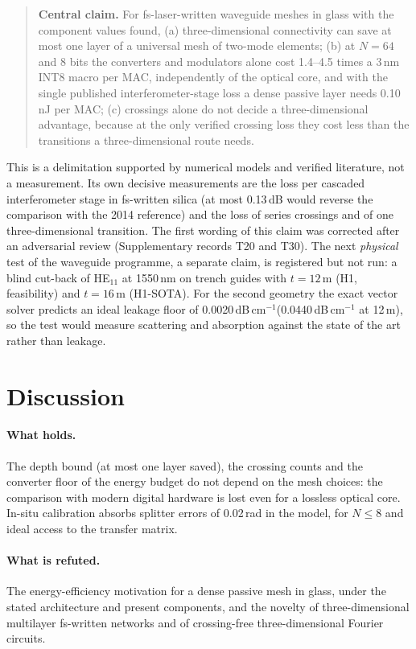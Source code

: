 \documentclass[10pt,a4paper]{article}
\newcommand{\dBcm}{\,dB\,cm$^{-1}$\xspace}
\begin{document}
\begin{quote}
\textbf{Central claim.} For fs-laser-written waveguide meshes in glass with the component values found, (a) three-dimensional connectivity can save at most one layer of a universal mesh of two-mode elements; (b) at $N=64$ and 8 bits the converters and modulators alone cost 1.4--4.5 times a 3\,nm INT8 macro per MAC, independently of the optical core, and with the single published interferometer-stage loss a dense passive layer needs 0.10\,nJ per MAC; (c) crossings alone do not decide a three-dimensional advantage, because at the only verified crossing loss they cost less than the transitions a three-dimensional route needs.
\end{quote}

This is a delimitation supported by numerical models and verified literature, not a measurement. Its own decisive measurements are the loss per cascaded interferometer stage in fs-written silica (at most 0.13\,dB would reverse the comparison with the 2014 reference) and the loss of series crossings and of one three-dimensional transition. The first wording of this claim was corrected after an adversarial review (Supplementary records T20 and T30). The next \emph{physical} test of the waveguide programme, a separate claim, is registered but not run: a blind cut-back of HE$_{11}$ at 1550\,nm on trench guides with $t=12$\,\textmu m (H1, feasibility) and $t=16$\,\textmu m (H1-SOTA). For the second geometry the exact vector solver predicts an ideal leakage floor of 0.0020\dBcm (0.0440\dBcm at 12\,\textmu m), so the test would measure scattering and absorption against the state of the art rather than leakage.


\section{Discussion}

\paragraph{What holds.} The depth bound (at most one layer saved), the crossing counts and the converter floor of the energy budget do not depend on the mesh choices: the comparison with modern digital hardware is lost even for a lossless optical core. In-situ calibration absorbs splitter errors of 0.02\,rad in the model, for $N\le8$ and ideal access to the transfer matrix.

\paragraph{What is refuted.} The energy-efficiency motivation for a dense passive mesh in glass, under the stated architecture and present components, and the novelty of three-dimensional multilayer fs-written networks and of crossing-free three-dimensional Fourier circuits.
\end{document}
